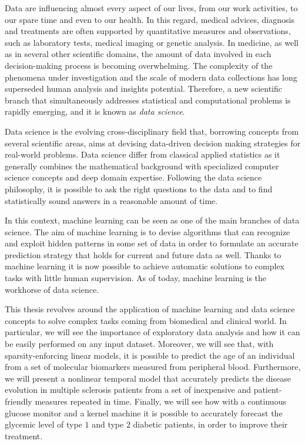 

Data are influencing almost every aspect of our lives, from our work activities, to our spare time and even to our health.
In this regard, medical advices, diagnosis and treatments are often supported by quantitative measures and observations, such as laboratory tests, medical imaging or genetic analysis.
In medicine, as well as in several other scientific domains, the amount of data involved in each decision-making process is becoming overwhelming.
The complexity of the phenomena under investigation and the scale of modern data collections has long superseded human analysis and insights potential.
Therefore, a new scientific branch that simultaneously addresses statistical and computational problems is rapidly emerging, and it is known as \textit{data science}.

Data science is the evolving cross-disciplinary field that, borrowing concepts from several scientific areas, aims at devising data-driven decision making strategies for real-world problems.
Data science differ from classical applied statistics as it generally combines the mathematical background with specialized computer science concepts and deep domain expertise.
Following the data science philosophy, it is possible to ask the right questions to the data and to find statistically sound answers in a reasonable amount of time.

In this context, machine learning can be seen as one of the main branches of data science. The aim of machine learning is to devise algorithms that can recognize and exploit hidden patterns in some set of data in order to formulate an accurate prediction strategy that holds for current and future data as well. Thanks to machine learning it is now possible to achieve automatic solutions to complex tasks with little human supervision.
As of today, machine learning is the workhorse of data science.

This thesis revolves around the application of machine learning and data science concepts to solve complex tasks coming from biomedical and clinical world. In particular, we will see the importance of exploratory data analysis and how it can be easily performed on any input dataset. Moreover, we will see that, with sparsity-enforcing linear models, it is possible to predict the age of an individual from a set of molecular biomarkers measured from peripheral blood. Furthermore, we will present a nonlinear temporal model that accurately predicts the disease evolution in multiple sclerosis patients from a set of inexpensive and patient-friendly measures repeated in time. Finally, we will see how with a continuous glucose monitor and a kernel machine it is possible to accurately forecast the glycemic level of type $1$ and type $2$ diabetic patients, in order to improve their treatment.





